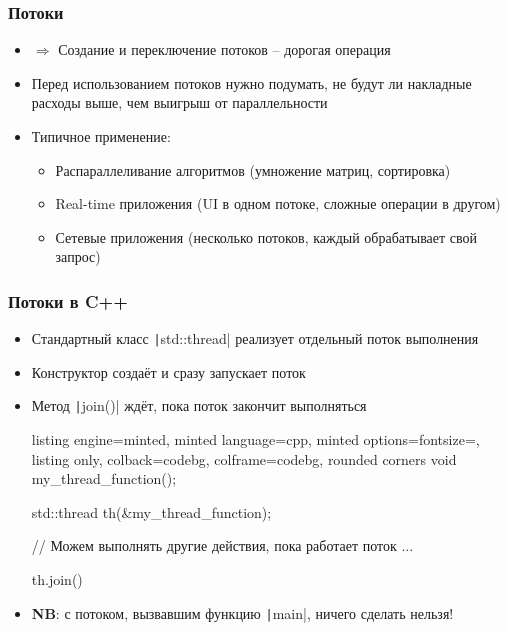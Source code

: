 \documentclass[10pt]{beamer}
\begin{document}
\begin{frame}[fragile]
\frametitle{Потоки}
\begin{itemize}
\item \(\Longrightarrow\) Создание и переключение потоков -- дорогая операция
\pause
\item Перед использованием потоков нужно подумать, не будут ли накладные расходы выше, чем выигрыш от параллельности
\pause
\item Типичное применение:
\pause
\begin{itemize}
\item Распараллеливание алгоритмов (умножение матриц, сортировка)
\pause
\item Real-time приложения (UI в одном потоке, сложные операции в другом)
\pause
\item Сетевые приложения (несколько потоков, каждый обрабатывает свой запрос)
\end{itemize}
\end{itemize}
\end{frame}

\begin{frame}[fragile]
\frametitle{Потоки в C++}
\begin{itemize}
\item Стандартный класс \texttt|std::thread| реализует отдельный поток выполнения
\pause
\item Конструктор создаёт и сразу запускает поток
\pause
\item Метод \texttt|join()| ждёт, пока поток закончит выполняться
\pause
{}
\begin{tcblisting}{listing engine=minted, minted language=cpp, minted options={fontsize=\scriptsize}, listing only, colback=codebg, colframe=codebg, rounded corners}
void my_thread_function();

std::thread th(&my_thread_function);

// Можем выполнять другие действия, пока работает поток
...

th.join()
\end{tcblisting}
\pause
{}
\item \textbf{NB}: с потоком, вызвавшим функцию \texttt|main|, ничего сделать нельзя!
\end{itemize}
\end{frame}
\end{document}
